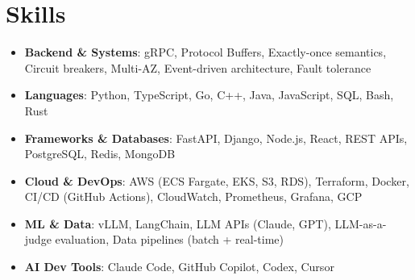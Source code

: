 \documentclass[letterpaper,11pt]{article}
\newcommand{\resumeSubHeadingListStart}{\begin{itemize}[leftmargin=0.15in, label={}]}
\newcommand{\resumeSubHeadingListEnd}{\end{itemize}}
\newcommand{\resumeSkillHeading}[2]{%
  \item\small{\textbf{#1}: #2 \vspace{-9pt}}%
}
\begin{document}
\section{Skills}
  \resumeSubHeadingListStart
    \resumeSkillHeading{Backend \& Systems}{gRPC, Protocol Buffers, Exactly-once semantics, Circuit breakers, Multi-AZ, Event-driven architecture, Fault tolerance}
    \resumeSkillHeading{Languages}{Python, TypeScript, Go, C++, Java, JavaScript, SQL, Bash, Rust}
    \resumeSkillHeading{Frameworks \& Databases}{FastAPI, Django, Node.js, React, REST APIs, PostgreSQL, Redis, MongoDB}
    \resumeSkillHeading{Cloud \& DevOps}{AWS (ECS Fargate, EKS, S3, RDS), Terraform, Docker, CI/CD (GitHub Actions), CloudWatch, Prometheus, Grafana, GCP}
    \resumeSkillHeading{ML \& Data}{vLLM, LangChain, LLM APIs (Claude, GPT), LLM-as-a-judge evaluation, Data pipelines (batch + real-time)}
    \resumeSkillHeading{AI Dev Tools}{Claude Code, GitHub Copilot, Codex, Cursor}
  \resumeSubHeadingListEnd
\end{document}
